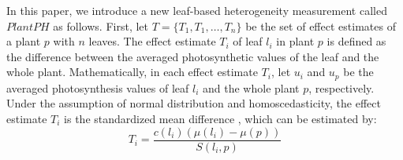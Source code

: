 \documentclass{bioinfo}
\begin{document}
{\begin{methods}

%


%
%
%


In this paper, we introduce a new leaf-based heterogeneity measurement called $PlantPH$ as follows.
%
First, let $T = \{T_{1}, T_{1}, \ldots, T_{n}\}$ be the set of effect estimates of a plant $p$ with $n$ leaves.
The effect estimate $T_{i}$ of leaf $l_i$ in plant $p$ is defined as the difference between the averaged photosynthetic values of the leaf and  the whole plant.
%
Mathematically, in each effect estimate $T_i$, let $u_i$ and $u_p$ be the averaged photosynthesis values of leaf $l_i$ and the whole plant $p$, respectively. Under the assumption of normal distribution and homoscedasticity, the effect estimate $T_i$ is the standardized mean difference \citep{hedges1998fixed}, which can be estimated by: %
%
\begin{equation}\label{eq:effectestimate}
T_{i} =  \frac{c(l_i)\left(\mu(l_i)-\mu(p)\right)}{S(l_i,p)}
\end{equation}


\end{methods}}
\end{document}
